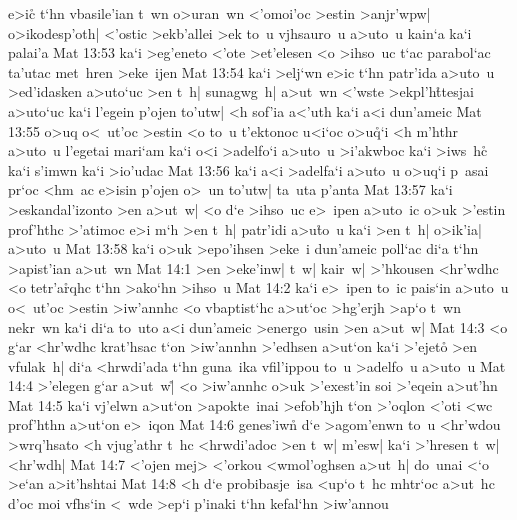 e>ic\r{}
t`hn
vbasile'ian
t~wn
o>uran~wn
<'omoi'oc
>estin
>anjr'wpw|
o>ikodesp'oth|
<'ostic
>ekb'allei
>ek
to~u
vjhsauro~u
a>uto~u
kain`a
ka`i
palai'a\bibvsend
\vs Mat 13:53
ka`i
>eg'eneto
<'ote
>et'elesen
<o
>ihso~uc
t`ac
parabol`ac
ta'utac
met~hren
>eke~ijen\bibvsend
\vs Mat 13:54
ka`i
>elj`wn
e>ic
t`hn
patr'ida
a>uto~u
>ed'idasken
a>uto`uc
>en
t~h|
sunagwg~h|
a>ut~wn
<'wste
>ekpl'h\r{t}tesjai
a>uto`uc
ka`i
l'egein
p'ojen
to'utw|
<h
sof'ia
a<'uth
ka`i
a<i
dun'ameic\bibvsend
\vs Mat 13:55
o>uq
o<~ut'oc
>estin
<o
to~u
t'ektonoc
u<i`oc
o>u\r{q}`i
<h
m'hthr
a>uto~u
l'egetai
mari`am
ka`i
o<i
>adelfo`i
a>uto~u
>i'akwboc
ka`i
>iws~h\r{c}
ka`i
s'imwn
ka`i
>io'udac\bibvsend
\vs Mat 13:56
ka`i
a<i
>adelfa`i
a>uto~u
o>uq`i
p~asai
pr`oc
<hm~ac
e>isin
p'ojen
o>~un
to'utw|
ta~uta
p'anta\bibvsend
\vs Mat 13:57
ka`i
>eskandal'izonto
>en
a>ut~w|
<o
d`e
>ihso~uc
e>~ipen
a>uto~ic
o>uk
>'estin
prof'hthc
>'atimoc
e>i
m`h
>en
t~h|
patr'idi
a>u\r{t}o~u
ka`i
>en
t~h|
o>ik'ia|
a>uto~u\bibvsend
\vs Mat 13:58
ka`i
o>uk
>epo'ihsen
>eke~i
dun'ameic
poll`ac
di`a
t`hn
>apist'ian
a>ut~wn\bibvsend
\vs Mat 14:1
>en
>eke'inw|
t~w|
kair~w|
>'hkousen
<hr'wdhc
<o
tetr'a\r{r}qhc
t`hn
>ako`hn
>ihso~u\bibvsend
\vs Mat 14:2
ka`i
e>~ipen
to~ic
pais`in
a>uto~u
o<~ut'oc
>estin
>iw'annhc
<o
vbaptist`hc
a>ut`oc
>hg'erjh
>ap`o
t~wn
nekr~wn
ka`i
di`a
to~uto
a<i
dun'ameic
>energo~usin
>en
a>ut~w|\bibvsend
\vs Mat 14:3
<o
g`ar
<hr'wdhc
krat'hsac
t`on
>iw'annhn
>'edhsen
a>ut`on
ka`i
>'ejeto\r{}
>en
vfulak~h|
di`a
<hrwdi'ada
t`hn
guna~ika
vfil'ippou
to~u
>adelfo~u
a>uto~u\bibvsend
\vs Mat 14:4
>'elegen
g`ar
a>ut~w|\r{}
<o
>iw'annhc
o>uk
>'exest'in
soi
>'eqein
a>ut'hn\bibvsend
\vs Mat 14:5
ka`i
vj'elwn
a>ut`on
>apokte~inai
>efob'hjh
t`on
>'oqlon
<'oti
<wc
prof'hthn
a>ut`on
e>~iqon\bibvsend
\vs Mat 14:6
genes'iwn\r{}
d`e
>agom'enwn
to~u
<hr'wdou
>wrq'hsato
<h
vjug'athr
t~hc
<hrwdi'adoc
>en
t~w|
m'esw|
ka`i
>'hresen
t~w|
<hr'wdh|\bibvsend
\vs Mat 14:7
<'ojen
mej>
<'orkou
<wmol'oghsen
a>ut~h|
do~unai
<`o
>e`an
a>it'hshtai\bibvsend
\vs Mat 14:8
<h
d`e
probibasje~isa
<up`o
t~hc
mhtr`oc
a>ut~hc
d'oc
moi
vfhs`in
<~wde
>ep`i
p'inaki
t`hn
kefal`hn
>iw'annou
